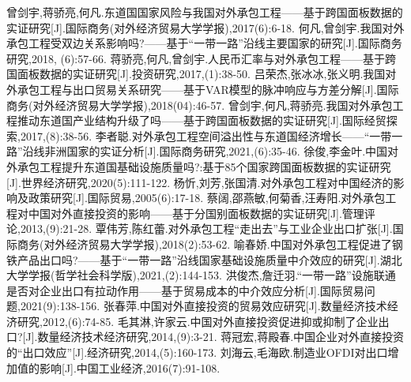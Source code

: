\documentclass[a4paper,12pt]{article}
\begin{document}
\begin{thebibliography}{99}  
			曾剑宇,蒋骄亮,何凡.东道国国家风险与我国对外承包工程——基于跨国面板数据的实证研究[J].国际商务(对外经济贸易大学学报),2017(6):6-18.
			何凡,曾剑宇.我国对外承包工程受双边关系影响吗?——基于“一带一路”沿线主要国家的研究[J].国际商务研究,2018, (6):57-66.
			蒋骄亮,何凡,曾剑宇.人民币汇率与对外承包工程——基于跨国面板数据的实证研究[J].投资研究,2017,(1):38-50.
			吕荣杰,张冰冰,张义明.我国对外承包工程与出口贸易关系研究——基于VAR模型的脉冲响应与方差分解[J].国际商务(对外经济贸易大学学报),2018(04):46-57.
			曾剑宇,何凡,蒋骄亮.我国对外承包工程推动东道国产业结构升级了吗——基于跨国面板数据的实证研究[J].国际经贸探索,2017,(8):38-56.
			李者聪.对外承包工程空间溢出性与东道国经济增长——“一带一路”沿线非洲国家的实证分析[J].国际商务研究,2021,(6):35-46.
			徐俊,李金叶.中国对外承包工程提升东道国基础设施质量吗?:基于85个国家跨国面板数据的实证研究[J].世界经济研究,2020(5):111-122.
			杨忻,刘芳,张国清.对外承包工程对中国经济的影响及政策研究[J].国际贸易,2005(6):17-18.
			蔡阔,邵燕敏,何菊香,汪寿阳.对外承包工程对中国对外直接投资的影响——基于分国别面板数据的实证研究[J].管理评论,2013,(9):21-28.
			覃伟芳,陈红蕾.对外承包工程“走出去”与工业企业出口扩张[J].国际商务(对外经济贸易大学学报),2018(2):53-62.
			喻春娇.中国对外承包工程促进了钢铁产品出口吗?——基于“一带一路”沿线国家基础设施质量中介效应的研究[J].湖北大学学报(哲学社会科学版),2021,(2):144-153.
			洪俊杰,詹迁羽.“一带一路”设施联通是否对企业出口有拉动作用——基于贸易成本的中介效应分析[J].国际贸易问题,2021(9):138-156.
			张春萍.中国对外直接投资的贸易效应研究[J].数量经济技术经济研究,2012,(6):74-85.
			毛其淋,许家云.中国对外直接投资促进抑或抑制了企业出口?[J].数量经济技术经济研究,2014,(9):3-21.
			蒋冠宏,蒋殿春.中国企业对外直接投资的“出口效应”[J].经济研究,2014,(5):160-173.
			刘海云,毛海欧.制造业OFDI对出口增加值的影响[J].中国工业经济,2016(7):91-108.
\end{thebibliography}

	
\end{document}
